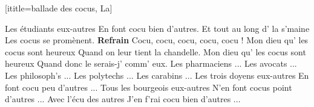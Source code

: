 [ititle={ballade des cocus, La}]

\beginverse
{}
Les étudiants eux-autres
En font cocu bien d'autres.
Et tout au long d' la s'maine
Les cocus se promènent.
\endverse
\beginchorus
\textbf{Refrain}
Cocu, cocu, cocu, cocu, cocu !
Mon dieu qu' les cocus sont heureux
Quand on leur tient la chandelle.
Mon dieu qu' les cocus sont heureux
Quand donc le serais-j' comm' eux.
\endchorus
\beginverse
{}
Les pharmaciens ...
\endverse
\beginverse
{}
Les avocats ...
\endverse
\beginverse
{}
Les philosoph's ...
\endverse
\beginverse
{}
Les polytechs ...
\endverse
\beginverse
{}
Les carabins ...
\endverse
\beginverse
{}
Les trois doyens eux-autres
En font cocu peu d'autres ...
\endverse
\beginverse
{}
Tous les bourgeois eux-autres
N'en font cocus point d'autres ...
\endverse
\beginverse
{}
Avec l'écu des autres
J'en f'rai cocu bien d'autres ...
\endverse
\endsong
